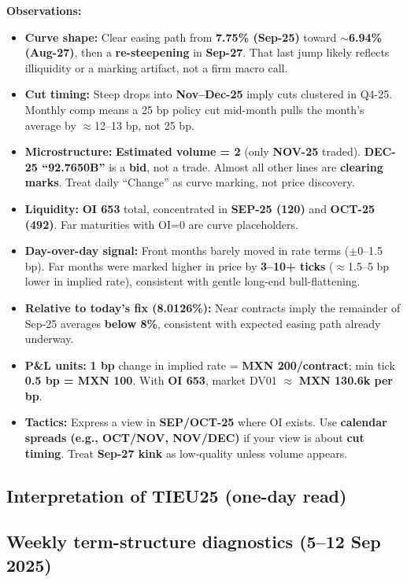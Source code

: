 \documentclass[11pt,a4paper]{article} %
\begin{document}
\textbf{Observations:}
\begin{itemize}
  \item \textbf{Curve shape:} Clear easing path from \textbf{7.75\% (Sep-25)} toward \textbf{$\sim$6.94\% (Aug-27)}, then a \textbf{re-steepening} in \textbf{Sep-27}. That last jump likely reflects illiquidity or a marking artifact, not a firm macro call.
  \item \textbf{Cut timing:} Steep drops into \textbf{Nov--Dec-25} imply cuts clustered in Q4-25. Monthly comp means a 25 bp policy cut mid-month pulls the month’s average by $\approx$12--13 bp, not 25 bp.
  \item \textbf{Microstructure:} \textbf{Estimated volume = 2} (only \textbf{NOV-25} traded). \textbf{DEC-25 ``92.7650B''} is a \textbf{bid}, not a trade. Almost all other lines are \textbf{clearing marks}. Treat daily ``Change'' as curve marking, not price discovery.
  \item \textbf{Liquidity:} \textbf{OI 653} total, concentrated in \textbf{SEP-25 (120)} and \textbf{OCT-25 (492)}. Far maturities with OI=0 are curve placeholders.
  \item \textbf{Day-over-day signal:} Front months barely moved in rate terms ($\pm$0--1.5 bp). Far months were marked higher in price by \textbf{3--10+ ticks} ($\approx$1.5--5 bp lower in implied rate), consistent with gentle long-end bull-flattening.
  \item \textbf{Relative to today’s fix (8.0126\%):} Near contracts imply the remainder of Sep-25 averages \textbf{below 8\%}, consistent with expected easing path already underway.
  \item \textbf{P\&L units:} \textbf{1 bp} change in implied rate = \textbf{MXN 200/contract}; min tick \textbf{0.5 bp = MXN 100}. With \textbf{OI 653}, market DV01 $\approx$ \textbf{MXN 130.6k per bp}.
  \item \textbf{Tactics:} Express a view in \textbf{SEP/OCT-25} where OI exists. Use \textbf{calendar spreads (e.g., OCT/NOV, NOV/DEC)} if your view is about \textbf{cut timing}. Treat \textbf{Sep-27 kink} as low-quality unless volume appears.
\end{itemize}


\subsection{Interpretation of \texorpdfstring{TIEU25}{TIEU25} (one-day read)}
\subsection{Weekly term-structure diagnostics (5–12 Sep 2025)}
\end{document}
